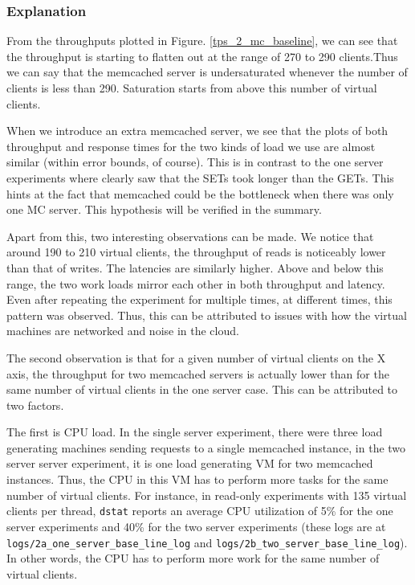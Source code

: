 \documentclass[11pt,a4paper]{article}
\newcommand\instructions[1]{\textcolor{blue}{Instructions: #1}}
\begin{document}
\subsubsection{Explanation}


From the throughputs plotted in Figure. \ref{tps_2_mc_baseline}, we can see that the throughput is starting to flatten out at the range of 270 to 290 clients.Thus we can say that the memcached server is undersaturated whenever the number of clients is less than 290. Saturation starts from above this number of virtual clients.

When we introduce an extra memcached server, we see that the plots of both throughput and response times for the two kinds of load we use are almost similar (within error bounds, of course). This is in contrast to the one server experiments where clearly saw that the SETs took longer than the GETs. This hints at the fact that memcached could be the bottleneck when there was only one MC server. This hypothesis will be verified in the summary.

Apart from this, two interesting observations can be made. We notice that around 190 to 210 virtual clients, the throughput of reads is noticeably lower than that of writes. The latencies are similarly higher. Above and below this range, the two work loads mirror each other in both throughput and latency. Even after repeating the experiment for multiple times, at different times, this pattern was observed. Thus, this can be attributed to issues with how the virtual machines are networked and noise in the cloud.

The second observation is that for a given number of virtual clients on the X axis, the throughput for two memcached servers is actually lower than for the same number of virtual clients in the one server case. This can be attributed to two factors. 

The first is CPU load. In the single server experiment, there were three load generating machines sending requests to a single memcached instance, in the two server server experiment, it is one load generating VM for two memcached instances. Thus, the CPU in this VM has to perform more tasks for the same number of virtual clients. For instance, in read-only experiments with 135 virtual clients per thread, \texttt{dstat} reports an average CPU utilization of 5\% for the one server experiments and 40\% for the two server experiments (these logs are at \texttt{logs/2a\_one\_server\_base\_line\_log} and \texttt{logs/2b\_two\_server\_base\_line\_log}). In other words, the CPU has to perform more work for the same number of virtual clients.
\end{document}
